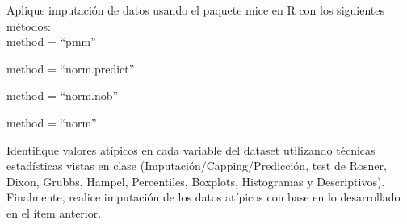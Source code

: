 \documentclass[
]{book}
\begin{document}
Aplique imputación de datos usando el paquete mice en R con los siguientes métodos:\\

method = ``pmm''

method = ``norm.predict''

method = ``norm.nob''

method = ``norm''

Identifique valores atípicos en cada variable del dataset utilizando técnicas estadísticas vistas en clase
(Imputación/Capping/Predicción, test de Rosner, Dixon, Grubbs, Hampel, Percentiles, Boxplots, Histogramas y Descriptivos).\\
Finalmente, realice imputación de los datos atípicos con base en lo desarrollado en el ítem anterior.

  
\end{document}
